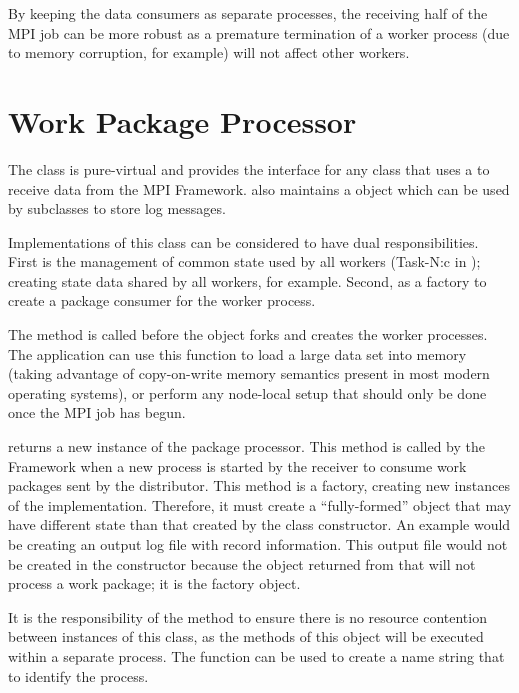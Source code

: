 By keeping the data consumers as separate processes, the receiving half
of the MPI job can be more robust as a premature termination of a worker
process (due to memory corruption, for example) will not affect other
workers.

\section{Work Package Processor}
\label{sec-workpackageprocessor}

The  class is pure-virtual and provides the
interface for any class that uses a  to receive data from
the MPI Framework.
 also maintains a  object which
can be used by subclasses to store log messages.

Implementations of this class can be considered to have dual responsibilities.
First is the management of common state used by all workers (Task-N:c in
); creating state data shared by all workers, for
example.
Second, as a factory to create a package consumer for the worker process.

The  method is called before the 
object forks and creates the worker processes. The application can use this
function to load a large data set into memory (taking advantage of copy-on-write
memory semantics present in most modern operating systems), or perform any
node-local setup that should only be done once the MPI job has begun.

 returns a new instance of the package processor.
This method is called by the Framework when a new process is started by the
receiver to consume work packages sent by the distributor. This method is a
factory, creating new instances of the 
implementation. Therefore, it must create a ``fully-formed'' object that may
have different state than that created by the class constructor. An example
would be creating an output log file with record information.
This output file would not be created in the constructor because the
object returned from that will not process a work package; it is the factory
object.

It is the
responsibility of the  method to ensure there is no
resource contention between instances of this class, as the methods of this
object will be executed within a separate process. The
 function can be used to create a name string
that to identify the process.

